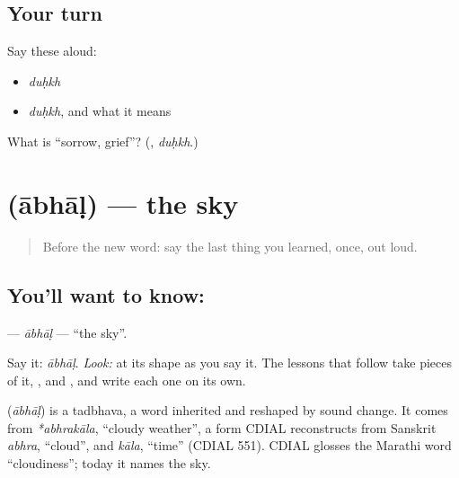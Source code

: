 \subsection*{Your turn}
Say these aloud:

\begin{itemize}
\raggedright
  \item \emph{duḥkh}
  \item \emph{duḥkh}, and what it means
\end{itemize}

\begin{tcolorbox}[breakable,colback=teal!4,colframe=teal!35!black,title={Before you move on}]
What is \textquotedblleft{}sorrow, grief\textquotedblright{}? (\textbf{}, \emph{duḥkh}.)
\end{tcolorbox}
\section[\texorpdfstring{\mr{आभाळ} (ābhāḷ)}{आभाळ (ābhāḷ)}]{ (ābhāḷ) — the sky}

\label{lesson:MR-C02-aabhaal}



\begin{quote}
Before the new word: say the last thing you learned, once, out loud.
\end{quote}

\subsection*{You'll want to know: }
\textbf{} — \emph{ābhāḷ} — \textquotedblleft{}the sky\textquotedblright{}.

Say it: \emph{ābhāḷ}. \emph{Look:} at its shape as you say it. The lessons that follow take pieces of it, \textbf{}, \textbf{} and \textbf{}, and write each one on its own.

\begin{cousinweb}
\textbf{} (\emph{ābhāḷ}) is a tadbhava, a word inherited and reshaped by sound change. It comes from \emph{*abhrakāla}, \textquotedblleft{}cloudy weather\textquotedblright{}, a form CDIAL reconstructs from Sanskrit \emph{abhra}, \textquotedblleft{}cloud\textquotedblright{}, and \emph{kāla}, \textquotedblleft{}time\textquotedblright{} (CDIAL 551). CDIAL glosses the Marathi word \textquotedblleft{}cloudiness\textquotedblright{}; today it names the sky.
\end{cousinweb}

